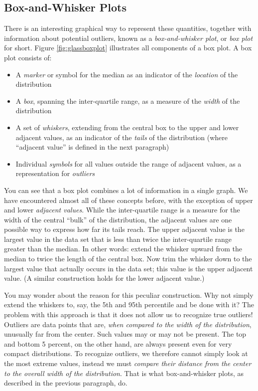 
\subsection{Box-and-Whisker Plots}


There is an interesting graphical way to represent these quantities,
together with information about potential outliers, known as a
\emph{box-and-whisker plot}, or \emph{box plot} for short. Figure
\ref{fig:glassboxplot} illustrates all components of a box plot. A box
plot consists of:

\begin{itemize}
\item A \emph{marker} or symbol for the median as an indicator of the
  \emph{location} of the distribution

\item A \emph{box}, spanning the inter-quartile range, as a measure of
  the \emph{width} of the distribution

\item A set of \emph{whiskers}, extending from the central box to the
  upper and lower adjacent values, as an indicator of the \emph{tails}
  of the distribution (where ``adjacent value'' is defined in the next
  paragraph)

\item Individual \emph{symbols} for all values outside the range of
  adjacent values, as a representation for \emph{outliers}
\end{itemize}

You can see that a box plot combines a lot of information in a single
graph. We have encountered almost all of these concepts before, with
the exception of upper and lower \emph{adjacent values}. While the
inter-quartile range is a measure for the width of the central
``bulk'' of the distribution, the adjacent values are one possible way
to express how far its tails reach.  The upper adjacent value is the
largest value in the data set that is less than twice the
inter-quartile range greater than the median. In other words: extend
the whisker upward from the median to twice the length of the central
box. Now trim the whisker down to the largest value that actually
occurs in the data set; this value is the upper adjacent value. (A
similar construction holds for the lower adjacent value.)

You may wonder about the reason for this peculiar construction. Why
not simply extend the whiskers to, say, the 5th and 95th percentile
and be done with it? The problem with this approach is that it does
not allow us to recognize true outliers! Outliers are data points that
are, \emph{when compared to the width of the distribution}, unusually
far from the center. Such values may or may not be present.  The top
and bottom 5 percent, on the other hand, are always present even for
very compact distributions. To recognize outliers, we therefore cannot
simply look at the most extreme values, instead we must \emph{compare
  their distance from the center to the overall width of the
  distribution}.  That is what box-and-whisker plots, as described in
the previous paragraph, do.

